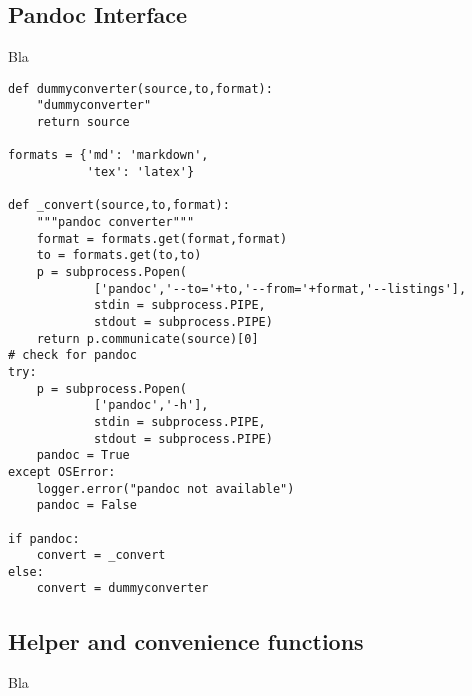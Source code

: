 \documentclass[neutral,proc,reqno]{ml-gen}
\begin{document}
\subsection{Pandoc Interface}

Bla

\begin{lstlisting}
def dummyconverter(source,to,format):
    "dummyconverter"
    return source

formats = {'md': 'markdown',
           'tex': 'latex'}

def _convert(source,to,format):
    """pandoc converter"""
    format = formats.get(format,format)
    to = formats.get(to,to)
    p = subprocess.Popen(
            ['pandoc','--to='+to,'--from='+format,'--listings'],
            stdin = subprocess.PIPE,
            stdout = subprocess.PIPE)
    return p.communicate(source)[0]
# check for pandoc
try:
    p = subprocess.Popen(
            ['pandoc','-h'],
            stdin = subprocess.PIPE,
            stdout = subprocess.PIPE)
    pandoc = True
except OSError:
    logger.error("pandoc not available")
    pandoc = False

if pandoc:
    convert = _convert
else:    
    convert = dummyconverter
\end{lstlisting}
\subsection{Helper and convenience functions}

Bla
\end{document}
